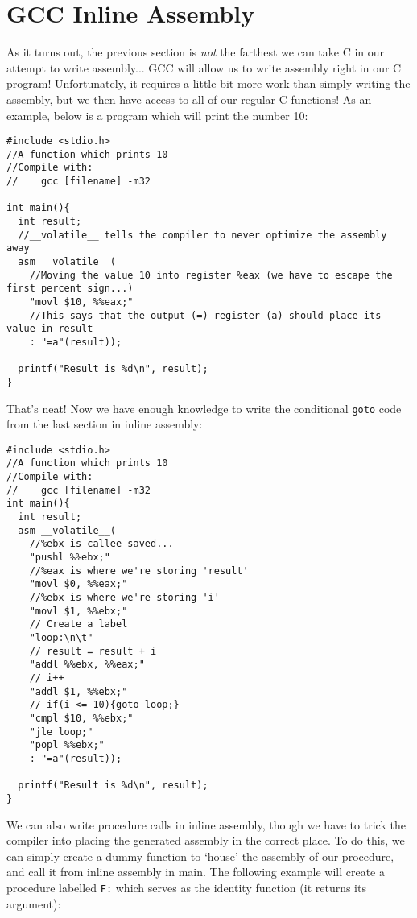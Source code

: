 \documentclass[10pt]{article}
\begin{document}
\section{GCC Inline Assembly}
As it turns out, the previous section is \textit{not} the farthest we can take C in our attempt to write assembly... GCC will allow us to write assembly right in our C program! Unfortunately, it requires a little bit more work than simply writing the assembly, but we then have access to all of our regular C functions! As an example, below is a program which will print the number 10:

\begin{lstlisting}
#include <stdio.h>
//A function which prints 10
//Compile with:
//    gcc [filename] -m32

int main(){
  int result;
  //__volatile__ tells the compiler to never optimize the assembly away
  asm __volatile__(
    //Moving the value 10 into register %eax (we have to escape the first percent sign...)
    "movl $10, %%eax;"
    //This says that the output (=) register (a) should place its value in result
    : "=a"(result));

  printf("Result is %d\n", result);
}
\end{lstlisting}

\newpage\noindent That's neat! Now we have enough knowledge to write the conditional \texttt{goto} code from the last section in inline assembly:

\begin{lstlisting}
#include <stdio.h>
//A function which prints 10
//Compile with:
//    gcc [filename] -m32
int main(){
  int result;
  asm __volatile__(
    //%ebx is callee saved...
    "pushl %%ebx;"
    //%eax is where we're storing 'result'
    "movl $0, %%eax;"
    //%ebx is where we're storing 'i'
    "movl $1, %%ebx;"
    // Create a label
    "loop:\n\t"
    // result = result + i
    "addl %%ebx, %%eax;"
    // i++
    "addl $1, %%ebx;"
    // if(i <= 10){goto loop;}
    "cmpl $10, %%ebx;"
    "jle loop;"
    "popl %%ebx;"
    : "=a"(result));

  printf("Result is %d\n", result);
}
\end{lstlisting}

\noindent We can also write procedure calls in inline assembly, though we have to trick the compiler into placing the generated assembly in the correct place. To do this, we can simply create a dummy function to `house' the assembly of our procedure, and call it from inline assembly in main. The following example will create a procedure labelled \texttt{F:} which serves as the identity function (it returns its argument):
\end{document}
